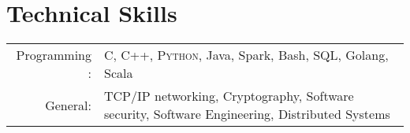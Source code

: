 \documentclass[a4paper,10pt]{article} %
\begin{document}

\section{Technical Skills}

\begin{tabular}{rl}
Programming : & \textsc{C}, C++, \textsc{Python},
    Java, Spark, Bash, SQL, Golang, Scala \\

    General: & TCP/IP networking, Cryptography, Software security, Software Engineering, Distributed Systems \\
\end{tabular}
\end{document}
